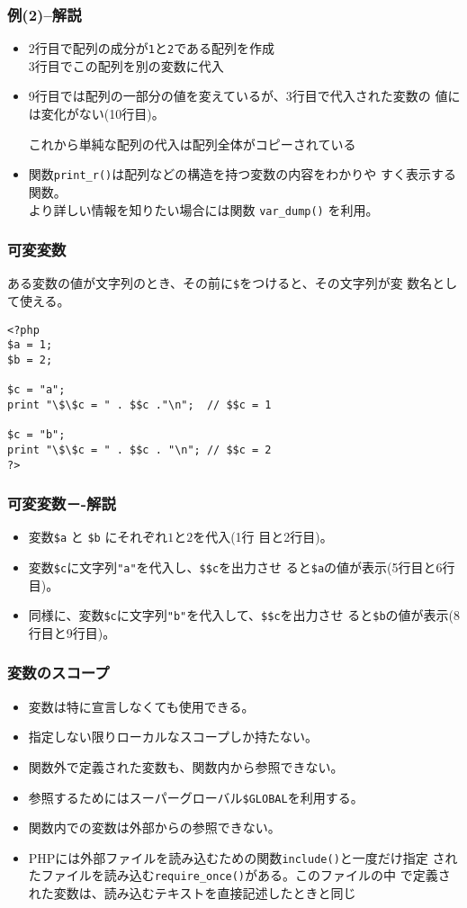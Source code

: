 \documentclass[dvipsk]{beamer}
\begin{document}
 \begin{frame}[containsverbatim]
  \frametitle{例(2)--解説}
 \begin{itemize}
 \item 2行目で配列の成分が\texttt{1}と\texttt{2}である配列を作成\\
       3行目でこの配列を別の変数に代入
 \item 9行目では配列の一部分の値を変えているが、3行目で代入された変数の
       値には変化がない(10行目)。

       これから単純な配列の代入は配列全体がコピーされている
 \item 関数\texttt{print\_r()}は配列などの構造を持つ変数の内容をわかりや
 すく表示する関数。\\より詳しい情報を知りたい場合には関数
       \verb+var_dump()+ を利用。
\end{itemize}
 \end{frame}
 \begin{frame}[containsverbatim]
  \frametitle{可変変数}
ある変数の値が文字列のとき、その前に\verb+$+をつけると、その文字列が変
  数名として使える。
\begin{verbatim}
<?php
$a = 1;
$b = 2;

$c = "a";
print "\$\$c = " . $$c ."\n";  // $$c = 1

$c = "b";
print "\$\$c = " . $$c . "\n"; // $$c = 2
?>
\end{verbatim}
 \end{frame}
 \begin{frame}[containsverbatim]
  \frametitle{可変変数－-解説}
  \begin{itemize}\upshape
   \item 変数\verb+$a+ と \verb+$b+ にそれぞれ$1$と$2$を代入(1行
         目と2行目)。
   \item 変数\verb+$c+に文字列\verb+"a"+を代入し、\verb+$$c+を出力させ
         ると\verb+$a+の値が表示(5行目と6行目)。
   \item 同様に、変数\verb+$c+に文字列\verb+"b"+を代入して、\verb+$$c+を出力させ
         ると\verb+$b+の値が表示(8行目と9行目)。
  \end{itemize}
 \end{frame}
\begin{frame}[containsverbatim]
\frametitle{変数のスコープ}
\begin{itemize}
 \item 変数は特に宣言しなくても使用できる。
 \item 指定しない限りローカルなスコープしか持たない。
 \item 関数外で定義された変数も、関数内から参照できない。
 \item 参照するためにはスーパーグローバル\verb+$GLOBAL+を利用する。
 \item 関数内での変数は外部からの参照できない。
 \item PHPには外部ファイルを読み込むための関数\texttt{include()}と一度だけ指定
されたファイルを読み込む\texttt{require\_once()}がある。このファイルの中
で定義された変数は、読み込むテキストを直接記述したときと同じ
\end{itemize}
\end{frame}
\end{document}
